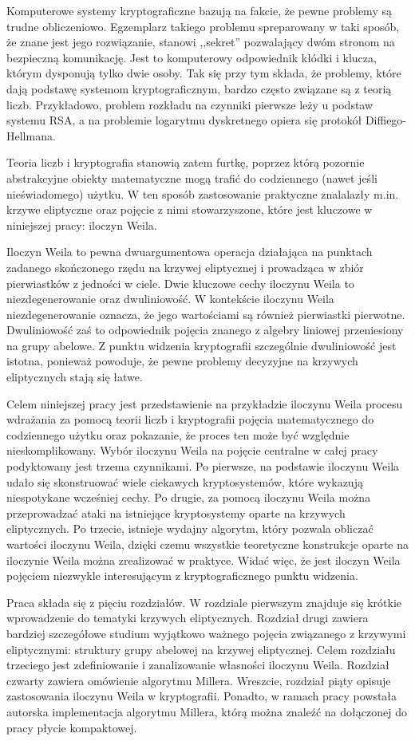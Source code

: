 \noindent
Komputerowe systemy kryptograficzne bazują na fakcie,
że pewne problemy są trudne obliczeniowo.
Egzemplarz takiego problemu spreparowany w taki sposób,
że znane jest jego rozwiązanie,
stanowi ,,sekret'' pozwalający dwóm stronom na bezpieczną komunikację.
Jest to komputerowy odpowiednik kłódki i klucza,
którym dysponują tylko dwie osoby.
Tak się przy tym składa,
że problemy, które dają podstawę systemom kryptograficznym,
bardzo często związane są z teorią liczb.
Przykładowo, problem rozkładu na czynniki pierwsze leży u podstaw systemu RSA,
a na problemie logarytmu dyskretnego opiera się protokół Diffiego-Hellmana.

\noindent
Teoria liczb i kryptografia stanowią zatem furtkę,
poprzez którą pozornie abstrakcyjne obiekty matematyczne
mogą trafić do codziennego (nawet jeśli nieświadomego) użytku.
W ten sposób zastosowanie praktyczne znalalazły
m.in. krzywe eliptyczne
oraz pojęcie z nimi stowarzyszone,
które jest kluczowe w niniejszej pracy: iloczyn Weila.

\noindent
Iloczyn Weila to pewna dwuargumentowa operacja działająca
na punktach zadanego skończonego rzędu na krzywej eliptycznej
i prowadząca w zbiór pierwiastków z jedności w ciele.
Dwie kluczowe cechy iloczynu Weila to niezdegenerowanie
oraz dwuliniowość.
W kontekście iloczynu Weila niezdegenerowanie oznacza,
że jego wartościami są również pierwiastki pierwotne.
Dwuliniowość zaś to odpowiednik pojęcia znanego z algebry liniowej
przeniesiony na grupy abelowe.
Z punktu widzenia kryptografii
szczególnie dwuliniowość jest istotna, ponieważ powoduje,
że pewne problemy decyzyjne na krzywych eliptycznych stają się łatwe.

\noindent
Celem niniejszej pracy jest przedstawienie na przykładzie iloczynu Weila
procesu wdrażania za pomocą teorii liczb i kryptografii
pojęcia matematycznego do codziennego użytku
oraz pokazanie, że proces ten może być względnie nieskomplikowany.
Wybór iloczynu Weila na pojęcie centralne w całej pracy
podyktowany jest trzema czynnikami.
Po pierwsze, na podstawie iloczynu Weila udało się skonstruować
wiele ciekawych kryptosystemów,
które wykazują niespotykane wcześniej cechy.
Po drugie, za pomocą iloczynu Weila można przeprowadzać
ataki na istniejące kryptosystemy oparte na krzywych eliptycznych.
Po trzecie, istnieje wydajny algorytm,
który pozwala obliczać wartości iloczynu Weila,
dzięki czemu wszystkie teoretyczne konstrukcje oparte na iloczynie Weila
można zrealizować w praktyce.
Widać więc, że jest iloczyn Weila pojęciem niezwykle interesującym
z kryptograficznego punktu widzenia.

\noindent
Praca składa się z pięciu rozdziałów.
W rozdziale pierwszym znajduje się krótkie wprowadzenie
do tematyki krzywych eliptycznych.
Rozdział drugi zawiera bardziej szczegółowe studium
wyjątkowo ważnego pojęcia związanego z krzywymi eliptycznymi:
struktury grupy abelowej na krzywej eliptycznej.
Celem rozdziału trzeciego
jest zdefiniowanie i zanalizowanie własności iloczynu Weila.
Rozdział czwarty zawiera omówienie algorytmu Millera.
Wreszcie, rozdział piąty opisuje zastosowania iloczynu Weila w kryptografii.
Ponadto, w ramach pracy powstała autorska implementacja algorytmu Millera,
którą można znaleźć na dołączonej do pracy płycie kompaktowej.
